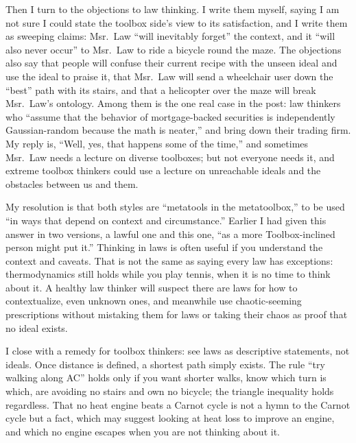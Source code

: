 Then I turn to the objections to law thinking. I write them myself, saying I am not sure I could state the toolbox side's view to its satisfaction, and I write them as sweeping claims: Msr.\ Law ``will inevitably forget'' the context, and it ``will also never occur'' to Msr.\ Law to ride a bicycle round the maze. The objections also say that people will confuse their current recipe with the unseen ideal and use the ideal to praise it, that Msr.\ Law will send a wheelchair user down the ``best'' path with its stairs, and that a helicopter over the maze will break Msr.\ Law's ontology. Among them is the one real case in the post: law thinkers who ``assume that the behavior of mortgage-backed securities is independently Gaussian-random because the math is neater,'' and bring down their trading firm. My reply is, ``Well, yes, that happens some of the time,'' and sometimes Msr.\ Law needs a lecture on diverse toolboxes; but not everyone needs it, and extreme toolbox thinkers could use a lecture on unreachable ideals and the obstacles between us and them. 

My resolution is that both styles are ``metatools in the metatoolbox,'' to be used ``in ways that depend on context and circumstance.'' Earlier I had given this answer in two versions, a lawful one and this one, ``as a more Toolbox-inclined person might put it.'' Thinking in laws is often useful if you understand the context and caveats. That is not the same as saying every law has exceptions: thermodynamics still holds while you play tennis, when it is no time to think about it. A healthy law thinker will suspect there are laws for how to contextualize, even unknown ones, and meanwhile use chaotic-seeming prescriptions without mistaking them for laws or taking their chaos as proof that no ideal exists.

I close with a remedy for toolbox thinkers: see laws as descriptive statements, not ideals. Once distance is defined, a shortest path simply exists. The rule ``try walking along AC'' holds only if you want shorter walks, know which turn is which, are avoiding no stairs and own no bicycle; the triangle inequality holds regardless. That no heat engine beats a Carnot cycle is not a hymn to the Carnot cycle but a fact, which may suggest looking at heat loss to improve an engine, and which no engine escapes when you are not thinking about it.

